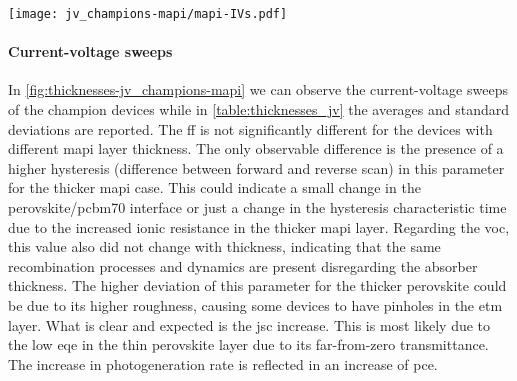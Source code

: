 	\begin{SCfigure}
		\centering
		\texttt{[image: jv\_champions-mapi/mapi-IVs.pdf]}
		\label{fig:thicknesses-jv_champions-mapi}
	\end{SCfigure}

	\paragraph{Current-voltage sweeps}
	In \cref{fig:thicknesses-jv_champions-mapi} we can observe the current-voltage sweeps of the champion devices while in \cref{table:thicknesses_jv} the averages and standard deviations are reported.
	The \gls{ff} is not significantly different for the devices with different \gls{mapi} layer thickness.
	The only observable difference is the presence of a higher hysteresis (difference between forward and reverse scan) in this parameter for the thicker \gls{mapi} case.
	This could indicate a small change in the perovskite\-/\gls{pcbm70} interface or just a change in the hysteresis characteristic time due to the increased ionic resistance in the thicker \gls{mapi} layer.
	Regarding the \gls{voc}, this value also did not change with thickness, indicating that the same recombination processes and dynamics are present disregarding the absorber thickness.
	The higher deviation of this parameter for the thicker perovskite could be due to its higher roughness, causing some devices to have pinholes in the \gls{etm} layer.
	What is clear and expected is the \gls{jsc} increase.
	This is most likely due to the low \gls{eqe} in the thin perovskite layer due to its far\hyp{}from\hyp{}zero transmittance.
	The increase in photogeneration rate is reflected in an increase of \gls{pce}.

